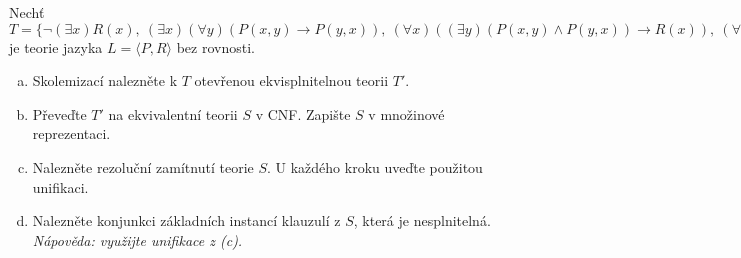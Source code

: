 \begin{problem}

    Nechť $T=\{\neg(\exists x) R(x),\ (\exists x)(\forall y)(P(x,y)\to P(y,x)),\ (\forall x)((\exists y)(P(x,y)\wedge P(y,x))\to R(x)),\ (\forall x)(\exists y)P(x,y)\}$ je teorie jazyka $L=\langle P,R\rangle$ bez rovnosti.

    \begin{enumerate}[(a)]
        \item Skolemizací nalezněte k $T$ otevřenou ekvisplnitelnou teorii $T'$.
        \item Převeďte $T'$ na ekvivalentní teorii $S$ v CNF. Zapište $S$ v množinové reprezentaci.
        \item Nalezněte rezoluční zamítnutí teorie $S$. U každého kroku uveďte použitou unifikaci.
        \item Nalezněte konjunkci základních instancí klauzulí z $S$, která je nesplnitelná. {\it Nápověda: využijte unifikace z (c).}       
    \end{enumerate}

    \begin{solution}
        

\end{solution}
\end{problem}
